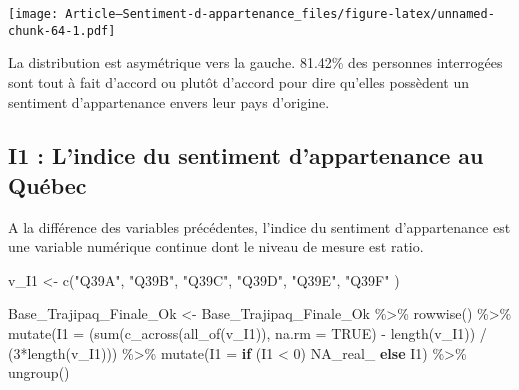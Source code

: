 \documentclass[
]{article}
\newenvironment{Shaded}{\begin{snugshade}}{\end{snugshade}}
\newcommand{\AttributeTok}[1]{\textcolor[rgb]{0.77,0.63,0.00}{#1}}
\newcommand{\ConstantTok}[1]{\textcolor[rgb]{0.00,0.00,0.00}{#1}}
\newcommand{\ControlFlowTok}[1]{\textcolor[rgb]{0.13,0.29,0.53}{\textbf{#1}}}
\newcommand{\DecValTok}[1]{\textcolor[rgb]{0.00,0.00,0.81}{#1}}
\newcommand{\FunctionTok}[1]{\textcolor[rgb]{0.00,0.00,0.00}{#1}}
\newcommand{\NormalTok}[1]{#1}
\newcommand{\OtherTok}[1]{\textcolor[rgb]{0.56,0.35,0.01}{#1}}
\newcommand{\SpecialCharTok}[1]{\textcolor[rgb]{0.00,0.00,0.00}{#1}}
\newcommand{\StringTok}[1]{\textcolor[rgb]{0.31,0.60,0.02}{#1}}
\begin{document}
\texttt{[image: Article---Sentiment-d-appartenance\_files/figure-latex/unnamed-chunk-64-1.pdf]}

La distribution est asymétrique vers la gauche. 81.42\% des personnes
interrogées sont tout à fait d'accord ou plutôt d'accord pour dire
qu'elles possèdent un sentiment d'appartenance envers leur pays
d'origine.

\hypertarget{i1-lindice-du-sentiment-dappartenance-au-quuxe9bec}{%
\subsection{I1 : L'indice du sentiment d'appartenance au
Québec}\label{i1-lindice-du-sentiment-dappartenance-au-quuxe9bec}}

A la différence des variables précédentes, l'indice du sentiment
d'appartenance est une variable numérique continue dont le niveau de
mesure est ratio.

\begin{Shaded}
\begin{Highlighting}[]
\NormalTok{v\_I1 }\OtherTok{\textless{}{-}} \FunctionTok{c}\NormalTok{(}\StringTok{"Q39A"}\NormalTok{,}
          \StringTok{"Q39B"}\NormalTok{,}
          \StringTok{"Q39C"}\NormalTok{,}
          \StringTok{"Q39D"}\NormalTok{,}
          \StringTok{"Q39E"}\NormalTok{,}
          \StringTok{"Q39F"}
\NormalTok{          )}

\NormalTok{Base\_Trajipaq\_Finale\_Ok }\OtherTok{\textless{}{-}}
\NormalTok{  Base\_Trajipaq\_Finale\_Ok }\SpecialCharTok{\%\textgreater{}\%}
  \FunctionTok{rowwise}\NormalTok{() }\SpecialCharTok{\%\textgreater{}\%}
  \FunctionTok{mutate}\NormalTok{(}\AttributeTok{I1 =}\NormalTok{ (}\FunctionTok{sum}\NormalTok{(}\FunctionTok{c\_across}\NormalTok{(}\FunctionTok{all\_of}\NormalTok{(v\_I1)), }\AttributeTok{na.rm =} \ConstantTok{TRUE}\NormalTok{) }\SpecialCharTok{{-}} \FunctionTok{length}\NormalTok{(v\_I1)) }\SpecialCharTok{/}\NormalTok{ (}\DecValTok{3}\SpecialCharTok{*}\FunctionTok{length}\NormalTok{(v\_I1))) }\SpecialCharTok{\%\textgreater{}\%}
  \FunctionTok{mutate}\NormalTok{(}\AttributeTok{I1 =} \ControlFlowTok{if}\NormalTok{ (I1 }\SpecialCharTok{\textless{}} \DecValTok{0}\NormalTok{) }\ConstantTok{NA\_real\_} \ControlFlowTok{else}\NormalTok{ I1) }\SpecialCharTok{\%\textgreater{}\%}
  \FunctionTok{ungroup}\NormalTok{()}
\end{Highlighting}
\end{Shaded}

\begin{Shaded}
\end{Shaded}
\end{document}
